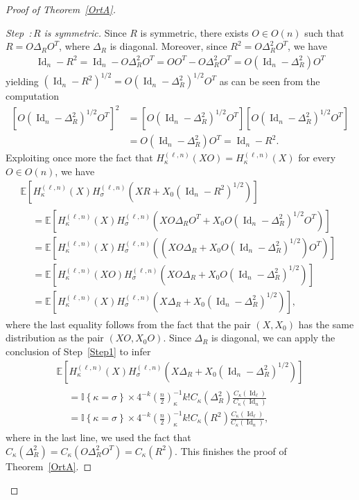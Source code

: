 \documentclass[AHL,Unicode,longabstracts,published]{cedram}
\DeclareMathOperator{\Id}{Id}
\newcommand{\E}[1]{\mathbb{E}\left[#1\right]}
\newcommand{\ind}[1]{\mathbb{I}
\left\{#1\right\}}
\newcounter{stepcount}
\newenvironment{step}[1]{\refstepcounter{stepcount}\begin{proof}[{Step~\thestepcount:\,}{#1}]}{\let\qed\relax\end{proof}}
\begin{document}
\begin{proof}[Proof of Theorem~\ref{OrtA}]
\begin{step}{{$R$ is symmetric}}\label{Step2}
Since $R$ is symmetric, there exists $O \in O(n)$ such that $R=O\Delta_R O^T$, where $\Delta_R$ is diagonal. Moreover, since $R^2=O\Delta_R^2O^T$, we have
\begin{gather*}
\Id_n-R^2 = \Id_n-O\Delta_R^2O^T = OO^T-O\Delta_R^2O^T = O\left(\Id_n-\Delta_R^2\right)O^T
\end{gather*}
yielding $(\Id_n-R^2)^{1/2} = O(\Id_n-\Delta_R^2)^{1/2}O^T$ as can be seen from the computation
\begin{align*}
\left[O\left(\Id_n-\Delta_R^2\right)^{1/2}O^T\right]^2 &= \left[O\left(\Id_n-\Delta_R^2\right)^{1/2}O^T\right]\left[O\left(\Id_n-\Delta_R^2\right)^{1/2}O^T\right] \\
&= O\left(\Id_n-\Delta_R^2\right)O^T = \Id_n-R^2.
\end{align*}
Exploiting once more the fact that $H_{\kappa}^{(\ell,n)}(XO) = H_{\kappa}^{(\ell,n)}(X)$ for every $O \in O(n)$, we have
\begin{multline*}
\E{H_{\kappa}^{(\ell,n)}(X) H_{\sigma}^{(\ell,n)}\left(XR+X_0\left(\Id_n-R^2\right)^{1/2}\right)} \\
\begin{aligned}
&= \E{H_{\kappa}^{(\ell,n)}(X) H_{\sigma}^{(\ell,n)}\left(XO \Delta_RO^T+X_0O\left(\Id_n-\Delta_R^2\right)^{1/2}O^T\right)} \\
&=\E{H_{\kappa}^{(\ell,n)}(X) H_{\sigma}^{(\ell,n)}\left(\left(XO \Delta_R +X_0O\left(\Id_n-\Delta_R^2\right)^{1/2}\right)O^T\right)} \\
&=\E{H_{\kappa}^{(\ell,n)}(XO) H_{\sigma}^{(\ell,n)}\left(XO \Delta_R +X_0O\left(\Id_n-\Delta_R^2\right)^{1/2}\right)} \\
&= \E{H_{\kappa}^{(\ell,n)}(X) H_{\sigma}^{(\ell,n)}\left(X \Delta_R +X_0 \left(\Id_n-\Delta_R^2\right)^{1/2}\right)},
\end{aligned}
\end{multline*}
where the last equality follows from the fact that the pair $(X,X_0)$ has the same distribution as the pair $(XO,X_0O)$. Since $\Delta_R$ is diagonal, we can apply the conclusion of Step~\ref{Step1} to infer
\begin{multline*}
\E{H_{\kappa}^{(\ell,n)}(X) H_{\sigma}^{(\ell,n)}\left(X \Delta_R +X_0 \left(\Id_n-\Delta_R^2\right)^{1/2}\right)} \\
\begin{aligned}
&= \ind{\kappa=\sigma}\times 4^{-k}\left(\frac{n}{2}\right)_{\kappa}^{-1} k ! C_{\kappa}\left(\Delta_R^2\right)\frac{C_{\kappa}(\Id_{\ell})}{C_{\kappa}(\Id_n)} \\
&= \ind{\kappa=\sigma}\times 4^{-k}\left(\frac{n}{2}\right)_{\kappa}^{-1} k ! C_{\kappa}\left(R^2\right)\frac{C_{\kappa}(\Id_{\ell})}{C_{\kappa}(\Id_n)},
\end{aligned}
\end{multline*}
where in the last line, we used the fact that $C_{\kappa}(\Delta_R^2) = C_{\kappa}(O\Delta_R^2O^T)= C_{\kappa}(R^2)$. This finishes the proof of Theorem~\ref{OrtA}.\qedhere 
\end{step}\let\qed\relax
\end{proof}
\end{document}
